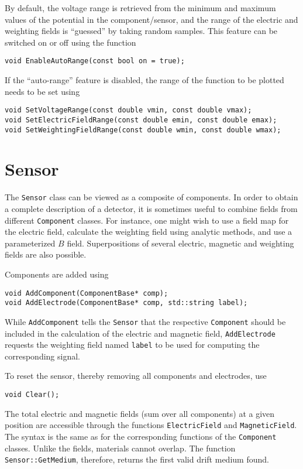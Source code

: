 By default, the voltage range is retrieved from the 
minimum and maximum values of the 
potential in the component/sensor, and
the range of the electric and weighting fields is
``guessed'' by taking random samples.
This feature can be switched on or off using the function
\begin{lstlisting}
void EnableAutoRange(const bool on = true);
\end{lstlisting}

If the ``auto-range'' feature is disabled,
the range of the function to be plotted needs to be set using
\begin{lstlisting}
void SetVoltageRange(const double vmin, const double vmax);
void SetElectricFieldRange(const double emin, const double emax);
void SetWeightingFieldRange(const double wmin, const double wmax);
\end{lstlisting}

\section{Sensor}

The \texttt{Sensor} class can be viewed as a composite of components. 
In order to obtain a complete description of a detector, 
it is sometimes useful to combine fields from different 
\texttt{Component} classes.
For instance, one might wish to use a field map for the electric field, 
calculate the weighting field using analytic methods, 
and use a parameterized \(B\) field. 
Superpositions of several electric, magnetic and weighting fields are also possible. 


Components are added using
\begin{lstlisting}
void AddComponent(ComponentBase* comp);
void AddElectrode(ComponentBase* comp, std::string label);
\end{lstlisting}
While \texttt{AddComponent} tells the \texttt{Sensor} that the 
respective \texttt{Component} should be included in the calculation 
of the electric and magnetic field, 
\texttt{AddElectrode} requests the weighting field named \texttt{label} 
to be used for computing the corresponding signal.

To reset the sensor, thereby removing all components and electrodes, use
\begin{lstlisting}
void Clear();
\end{lstlisting}

The total electric and magnetic fields 
(sum over all components) at a given position are accessible through 
the functions \texttt{ElectricField} and \texttt{MagneticField}.
The syntax is the same as for the corresponding functions of the 
\texttt{Component} classes.
Unlike the fields, materials cannot overlap. 
The function \texttt{Sensor::GetMedium}, therefore, 
returns the first valid drift medium found. 
 
